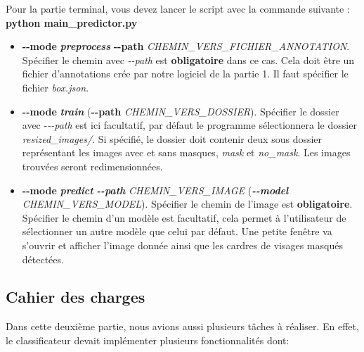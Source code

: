 \documentclass{rapport}
\begin{document}
            Pour la partie terminal, vous devez lancer le script avec la commande suivante :
            \textbf{python main\_predictor.py}
             \begin{itemize}
                 \item \textbf{-{}-mode} \textbf{\textit{preprocess}} \textbf{-{}-path} \textit{CHEMIN\_VERS\_FICHIER\_ANNOTATION}.
                 Spécifier le chemin avec \textit{-{}-path} est \textbf{obligatoire} dans ce cas. Cela doit être un fichier d'annotations crée par notre logiciel de la partie 1. Il faut spécifier le fichier \textit{box.json}.
                 
                 \item \textbf{-{}-mode} \textbf{\textit{train}} (\textbf{-{}-path} \textit{CHEMIN\_VERS\_DOSSIER}).
                 Spécifier le dossier avec -\textit{-{}-path} est ici facultatif, par défaut le programme sélectionnera le dossier \textit{resized\_images/}. Si spécifié, le dossier doit contenir deux sous dossier représentant les images avec et sans masques, \textit{mask} et \textit{no\_mask}. Les images trouvées seront redimensionnées.
                 
                 \item \textbf{-{}-mode} \textbf{\textit{predict}} \textbf{\textit{-{}-path}} \textit{CHEMIN\_VERS\_IMAGE} (\textbf{\textit{-{}-model}} \textit{CHEMIN\_VERS\_MODEL}).
                 Spécifier le chemin de l'image est \textbf{obligatoire}. Spécifier le chemin d'un modèle est facultatif, cela permet à l'utilisateur de sélectionner un autre modèle que celui par défaut. Une petite fenêtre va s'ouvrir et afficher l'image donnée ainsi que les cardres de visages masqués détectées.
             \end{itemize}
        
            
        \subsection{Cahier des charges}
            
            Dans cette deuxième partie, nous avions aussi plusieurs tâches à réaliser. En effet, le classificateur devait implémenter plusieurs fonctionnalités dont: 
            
\end{document}
